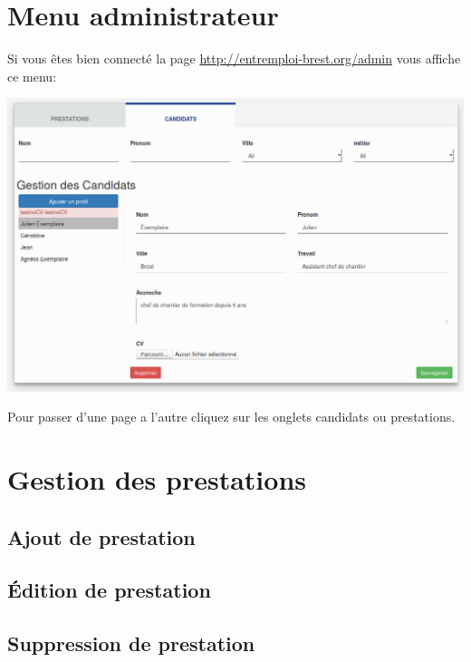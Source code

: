 \documentclass[a4paper, 12pt]{report}
\begin{document}
\section{Menu administrateur}
Si vous êtes bien connecté la page \url{http://entremploi-brest.org/admin} vous affiche ce menu:
\begin{center}
\includegraphics[width=16cm]{admin.png}
\end{center}
Pour passer d'une page a l'autre cliquez sur les onglets candidats ou prestations.

\section{Gestion des prestations}
\subsection{Ajout de prestation}
\subsection{Édition de prestation}
\subsection{Suppression de prestation}
\end{document}
